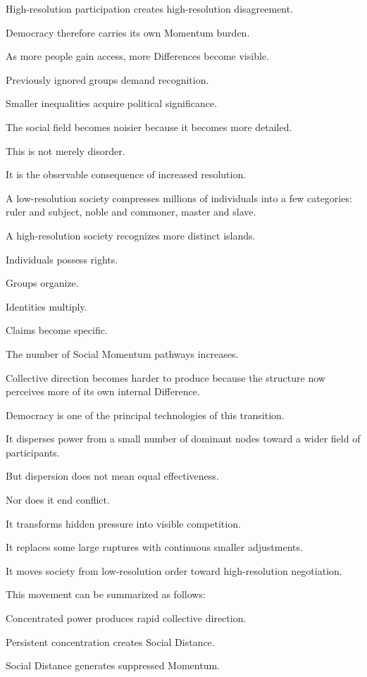 High-resolution participation creates high-resolution disagreement.

Democracy therefore carries its own Momentum burden.

As more people gain access, more Differences become visible.

Previously ignored groups demand recognition.

Smaller inequalities acquire political significance.

The social field becomes noisier because it becomes more detailed.

This is not merely disorder.

It is the observable consequence of increased resolution.

A low-resolution society compresses millions of individuals into a few categories: ruler and subject, noble and commoner, master and slave.

A high-resolution society recognizes more distinct islands.

Individuals possess rights.

Groups organize.

Identities multiply.

Claims become specific.

The number of Social Momentum pathways increases.

Collective direction becomes harder to produce because the structure now perceives more of its own internal Difference.

Democracy is one of the principal technologies of this transition.

It disperses power from a small number of dominant nodes toward a wider field of participants.

But dispersion does not mean equal effectiveness.

Nor does it end conflict.

It transforms hidden pressure into visible competition.

It replaces some large ruptures with continuous smaller adjustments.

It moves society from low-resolution order toward high-resolution negotiation.

This movement can be summarized as follows:

Concentrated power produces rapid collective direction.

Persistent concentration creates Social Distance.

Social Distance generates suppressed Momentum.

